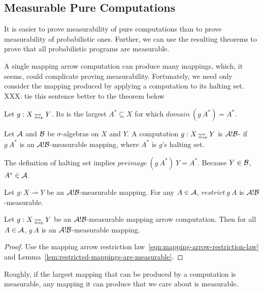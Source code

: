 \documentclass[preprint]{sigplanconf}
\newcommand{\arrow}{\rightsquigarrow}
\newcommand{\pto}{\rightharpoonup}
\newcommand{\map}{_\mathrm{map}}
\DeclareMathOperator{\mapto}{\arrow_{\mspace{-21mu}\map}}
\begin{document}
\subsection{Measurable Pure Computations}

It is easier to prove measurability of pure computations than to prove measurability of probabilistic ones.
Further, we can use the resulting theorems to prove that all probabilistic programs are measurable.

A single mapping arrow computation can produce many mappings, which, it seems, could complicate proving measurability.
Fortunately, we need only consider the mapping produced by applying a computation to its halting set. XXX: tie this sentence better to the theorem below

\begin{definition}
Let $g : X \mapto Y$. Its  is the largest $A^* \subseteq X$ for which $domain~(g~A^*) = A^*$.
\end{definition}

\begin{definition}
Let $\mathcal{A}$ and $\mathcal{B}$ be $\sigma$-algebras on $X$ and $Y$.
A computation $g : X \mapto Y$ is $\mathcal{A}!\mathcal{B}$- if $g~A^*$ is an $\mathcal{A}!\mathcal{B}$-measurable mapping, where $A^*$ is $g$'s halting set.
\end{definition}

The definition of halting set implies $preimage~(g~A^*)~Y = A^*$.
Because $Y \in \mathcal{B}$, $A^* \in \mathcal{A}$.

\begin{lemma}
Let $g : X \pto Y$ be an $\mathcal{A}!\mathcal{B}$-measurable mapping.
For any $A \in \mathcal{A}$, $restrict~g~A$ is $\mathcal{A}!\mathcal{B}$-measurable.
\label{lem:restricted-mappings-are-measurable}
\end{lemma}

\begin{theorem}
Let $g : X \mapto Y$ be an $\mathcal{A}!\mathcal{B}$-measurable mapping arrow computation.
Then for all $A \in \mathcal{A}$, $g~A$ is an $\mathcal{A}!\mathcal{B}$-measurable mapping.
\label{thm:restricted-computations-are-measurable}
\end{theorem}
\begin{proof}
Use the mapping arrow restriction law~\eqref{eqn:mapping-arrow-restriction-law} and Lemma~\ref{lem:restricted-mappings-are-measurable}.
\end{proof}

Roughly, if the largest mapping that can be produced by a computation is measurable, any mapping it can produce that we care about is measurable.
\end{document}
